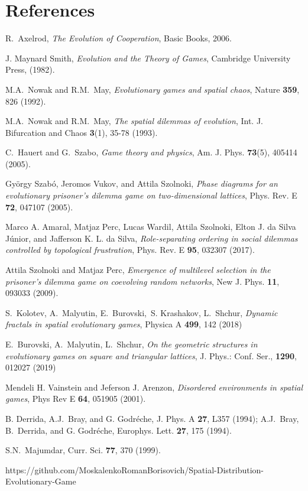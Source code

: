 \documentclass[a4paper]{jpconf}
\begin{document}
\section*{References}
\begin{thebibliography}{9}

  R.~Axelrod, \textit{The Evolution of Cooperation}, Basic Books,
2006.

 J. Maynard Smith, \textit{Evolution and the Theory of Games},
Cambridge University Press, (1982).

 M.A.~Nowak and R.M.~May, \textit{Evolutionary games
and spatial chaos}, Nature \textbf{359}, 826 (1992).

 M.A.~Nowak and R.M.~May, \textit{The spatial
dilemmas of evolution}, Int. J. Bifurcation and Chaos \textbf{3}(1), 35-78 (1993).

 C.~Hauert and G.~Szabo, \textit{Game theory and physics},
Am. J. Phys. \textbf{73}(5), 405414 (2005).


 Gy\"{o}rgy Szab\'{o}, Jeromos Vukov, and Attila Szolnoki, \textit{Phase diagrams for an evolutionary prisoner’s dilemma game on two-dimensional lattices}, Phys. Rev. E \textbf{72}, 047107 (2005).

 Marco A. Amaral, Matjaz Perc,  Lucas Wardil, Attila Szolnoki, Elton J. da Silva J\'{u}nior, and Jafferson K. L. da Silva, \textit{Role-separating ordering in social dilemmas controlled by topological frustration}, Phys. Rev. E \textbf{95}, 032307 (2017).

 Attila Szolnoki and Matjaz Perc, \textit{Emergence of multilevel selection in the prisoner's dilemma game on coevolving random networks}, New J. Phys. \textbf{11}, 093033 (2009).

 S.~Kolotev, A.~Malyutin, E.~Burovski,~S. Krashakov, L.~Shchur, \textit{Dynamic fractals in spatial evolutionary games}, Physica A  \textbf{499}, 142 (2018)

 E.~Burovski, A.~Malyutin, L.~Shchur, \textit{On the geometric structures in evolutionary games on square and triangular lattices}, J. Phys.: Conf. Ser., \textbf{1290}, 012027 (2019) 

  Mendeli H. Vainstein and Jeferson J. Arenzon, \textit{Disordered environments in spatial games}, Phys Rev E \textbf{64}, 051905 (2001).

 B. Derrida, A.J.~Bray, and G. Godr\'{e}che, J. Phys. A \textbf{27}, L357 (1994); A.J.~Bray, B.~Derrida, and G. Godr\'{e}che, Europhys. Lett. \textbf{27}, 175 (1994).

 S.N.~Majumdar, Curr. Sci. \textbf{77}, 370 (1999).

 https://github.com/MoskalenkoRomanBorisovich/Spatial-Distribution-Evolutionary-Game 


\end{thebibliography}
\end{document}
